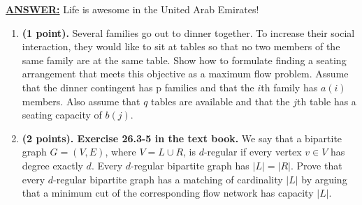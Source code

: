 \documentclass{article}
\begin{document}
\medskip
\noindent \underline{\textbf{ANSWER:}} Life is awesome in the United
Arab Emirates!

\begin{enumerate}
\item {\bf (1 point).} Several families go out to dinner together. To
  increase their social interaction, they would like to sit at tables
  so that no two members of the same family are at the same
  table. Show how to formulate finding a seating arrangement that
  meets this objective as a maximum flow problem. Assume that the
  dinner contingent has p families and that the $i$th family has
  $a(i)$ members. Also assume that $q$ tables are available and that
  the $j$th table has a seating capacity of $b(j)$. 
\item {\bf (2 points). Exercise 26.3-5 in the text book.} We say that
  a bipartite graph $G=(V,E)$, where $V=L\cup R$, is $d$-regular if
  every vertex $v\in V$ has degree exactly $d$. Every $d$-regular
  bipartite graph has $|L| = |R|$. Prove that every $d$-regular
  bipartite graph has a matching of cardinality $|L|$ by arguing that
  a minimum cut of the corresponding flow network has capacity $|L|$.
\end{enumerate}
\end{document}
